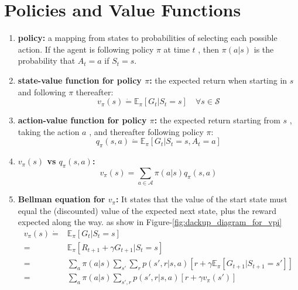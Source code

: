 \section{Policies and Value Functions}
\begin{enumerate}
    \item \textbf{policy:} a mapping from states to probabilities of selecting each possible action. If the agent is following policy $\pi$ at time $t$ , then $\pi(a|s)$ is the probability that $A_t = a$ if $S_t = s$.

    \item \textbf{state-value function for policy $\pi$:} the expected return when starting in $s$ and following $\pi$ thereafter:
        \begin{equation}
            v_{\pi}(s) \dot{=} \mathbb{E}_{\pi}[G_t|S_t=s] \quad \forall s \in \mathcal{S}
        \end{equation}

    \item \textbf{action-value function for policy $\pi$:} the expected return starting from $s$ , taking the action $a$ , and thereafter following policy $\pi$:
        \begin{equation}
            q_{\pi}(s,a) \dot{=} \mathbb{E}_{\pi}[G_t|S_t=s, A_t=a]
        \end{equation}

    \item \textbf{$v_{\pi}(s)$ vs $q_{\pi}(s,a)$:}
        \begin{equation}
            v_{\pi}(s) = \sum_{a \in \mathcal{A}}\pi(a|s)q_{\pi}(s,a)
        \end{equation}

    \item \textbf{Bellman equation for $v_{\pi}$:} It states that the value of the start state must equal the (discounted) value of the expected next state, plus the reward expected along the way. as show in Figure-\ref{fig:dackup_diagram_for_vpi}
        \begin{equation}
        \begin{split}
            v_{\pi}(s) \dot{=} & \mathbb{E}_{\pi}[G_t|S_t=s]\\
                = & \mathbb{E}_{\pi}[R_{t+1}+\gamma G_{t+1}|S_t=s]\\
                = & \sum_{a}\pi(a|s)\sum_{s'}\sum_{r}p(s',r|s,a)[r+\gamma \mathbb{E}_{\pi}[G_{t+1}|S_{t+1}=s']]\\
                = & \sum_{a}\pi(a|s)\sum_{s', r}p(s',r|s,a)[r+\gamma v_{\pi}(s')]
        \end{split}
        \end{equation}


\end{enumerate}
